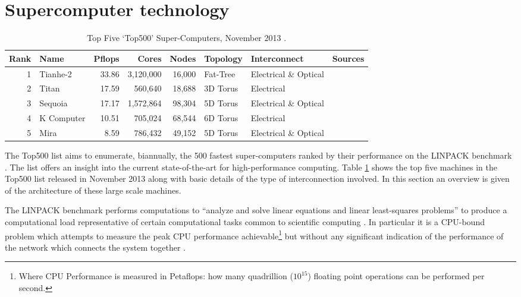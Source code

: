 	
	\section{Supercomputer technology}
		\label{sec:supercomputers}
		
		\begin{table}
			\center
			\begin{tabular}{r l r r r l l l}
				\toprule
				Rank & Name    & Pflops& Cores  & Nodes  & Topology & Interconnect          & Sources \\
				\midrule                          
				1 & Tianhe-2   & 33.86 & 3,120,000 & 16,000 & Fat-Tree & Electrical \& Optical & \cite{dongarra13} \\
				2 & Titan      & 17.59 & 560,640   & 18,688 & 3D Torus & Electrical            & \cite{bland12} \\
				3 & Sequoia    & 17.17 & 1,572,864 & 98,304 & 5D Torus & Electrical \& Optical & \cite{prickett10} \\
				4 & K Computer & 10.51 & 705,024   & 68,544 & 6D Torus & Electrical            & \cite{fujitsu11,yokokawa11} \\
				5 & Mira       &  8.59 & 786,432   & 49,152 & 5D Torus & Electrical \& Optical & \cite{prickett10} \\
				\bottomrule
			\end{tabular}
			
			\caption{Top Five `Top500' Super-Computers, November 2013 \cite{meuer13n}.}
			\label{tab:top500}
		\end{table}
		
		The Top500 list \cite{meuer13n} aims to enumerate, biannually, the 500
		fastest super-computers ranked by their performance on the LINPACK benchmark
		\cite{dongarraLINPAC}. The list offers an insight into the current
		state-of-the-art for high-performance computing. Table \ref{tab:top500}
		shows the top five machines in the Top500 list released in November 2013
		along with basic details of the type of interconnection involved. In this
		section an overview is given of the architecture of these large scale
		machines.
		
		The LINPACK benchmark performs computations to ``analyze and solve linear
		equations and linear least-squares problems'' to produce a computational
		load representative of certain computational tasks common to scientific
		computing \cite{dongarra84}. In particular it is a CPU-bound problem which
		attempts to measure the peak CPU performance achievable\footnote{Where CPU
		Performance is measured in Petaflops: how many quadrillion ($10^{15}$)
		floating point operations can be performed per second.} but without any
		significant indication of the performance of the network which connects the
		system together \cite{dongarra07}.
		
